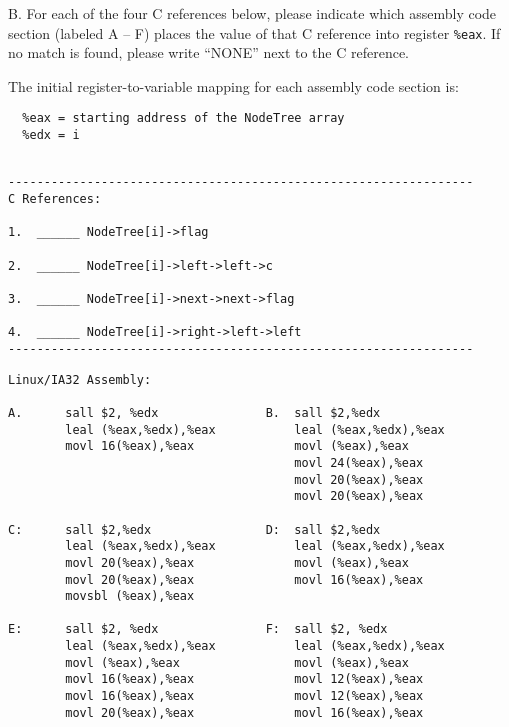 \newpage
B.  For each of the four C references below, please indicate which
assembly code section (labeled A -- F) places the value of that C
reference into register {\tt \%eax}. If no match is found, please
write ``NONE'' next to the C reference. 

The initial register-to-variable mapping for each assembly code 
section is:
\begin{verbatim}
  %eax = starting address of the NodeTree array
  %edx = i
\end{verbatim}
\begin{verbatim}

-----------------------------------------------------------------
C References:

1.  ______ NodeTree[i]->flag        

2.  ______ NodeTree[i]->left->left->c

3.  ______ NodeTree[i]->next->next->flag 

4.  ______ NodeTree[i]->right->left->left
-----------------------------------------------------------------
\end{verbatim}
\begin{verbatim}
Linux/IA32 Assembly:

A.      sall $2, %edx               B.  sall $2,%edx
        leal (%eax,%edx),%eax           leal (%eax,%edx),%eax
        movl 16(%eax),%eax              movl (%eax),%eax
                                        movl 24(%eax),%eax
                                        movl 20(%eax),%eax
                                        movl 20(%eax),%eax

C:      sall $2,%edx                D:  sall $2,%edx
        leal (%eax,%edx),%eax           leal (%eax,%edx),%eax   
        movl 20(%eax),%eax              movl (%eax),%eax
        movl 20(%eax),%eax              movl 16(%eax),%eax
        movsbl (%eax),%eax              
        
E:      sall $2, %edx               F:  sall $2, %edx
        leal (%eax,%edx),%eax           leal (%eax,%edx),%eax
        movl (%eax),%eax                movl (%eax),%eax
        movl 16(%eax),%eax              movl 12(%eax),%eax
        movl 16(%eax),%eax              movl 12(%eax),%eax
        movl 20(%eax),%eax              movl 16(%eax),%eax
\end{verbatim}


        




